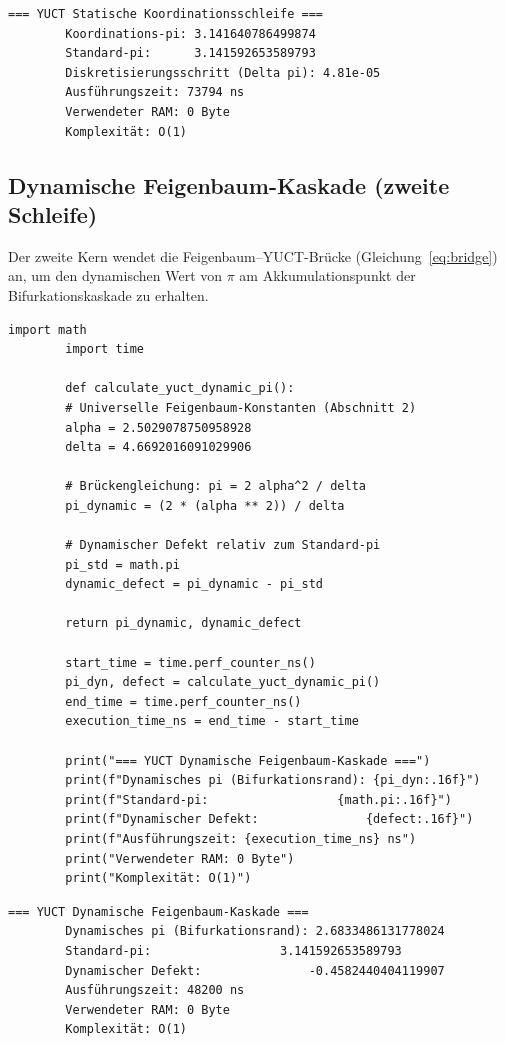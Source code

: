 \documentclass[12pt,a4paper]{article}
\begin{document}
	\begin{lstlisting}[style=output, caption={Ausgabe des statischen Kerns}]
		=== YUCT Statische Koordinationsschleife ===
		Koordinations-pi: 3.141640786499874
		Standard-pi:      3.141592653589793
		Diskretisierungsschritt (Delta pi): 4.81e-05
		Ausführungszeit: 73794 ns
		Verwendeter RAM: 0 Byte
		Komplexität: O(1)
	\end{lstlisting}
	
	\subsection{Dynamische Feigenbaum-Kaskade (zweite Schleife)}
	Der zweite Kern wendet die Feigenbaum–YUCT-Brücke (Gleichung~\ref{eq:bridge}) an, um den dynamischen Wert von $\pi$ am Akkumulationspunkt der Bifurkationskaskade zu erhalten.
	
	\begin{lstlisting}[caption={YUCT-Kern für das dynamische Feigenbaum-$\pi$}]
		import math
		import time
		
		def calculate_yuct_dynamic_pi():
		# Universelle Feigenbaum-Konstanten (Abschnitt 2)
		alpha = 2.5029078750958928
		delta = 4.6692016091029906
		
		# Brückengleichung: pi = 2 alpha^2 / delta
		pi_dynamic = (2 * (alpha ** 2)) / delta
		
		# Dynamischer Defekt relativ zum Standard-pi
		pi_std = math.pi
		dynamic_defect = pi_dynamic - pi_std
		
		return pi_dynamic, dynamic_defect
		
		start_time = time.perf_counter_ns()
		pi_dyn, defect = calculate_yuct_dynamic_pi()
		end_time = time.perf_counter_ns()
		execution_time_ns = end_time - start_time
		
		print("=== YUCT Dynamische Feigenbaum-Kaskade ===")
		print(f"Dynamisches pi (Bifurkationsrand): {pi_dyn:.16f}")
		print(f"Standard-pi:                  {math.pi:.16f}")
		print(f"Dynamischer Defekt:               {defect:.16f}")
		print(f"Ausführungszeit: {execution_time_ns} ns")
		print("Verwendeter RAM: 0 Byte")
		print("Komplexität: O(1)")
	\end{lstlisting}
	
	\begin{lstlisting}[style=output, caption={Ausgabe des dynamischen Kerns}]
		=== YUCT Dynamische Feigenbaum-Kaskade ===
		Dynamisches pi (Bifurkationsrand): 2.6833486131778024
		Standard-pi:                  3.141592653589793
		Dynamischer Defekt:               -0.4582440404119907
		Ausführungszeit: 48200 ns
		Verwendeter RAM: 0 Byte
		Komplexität: O(1)
	\end{lstlisting}
	
\end{document}
